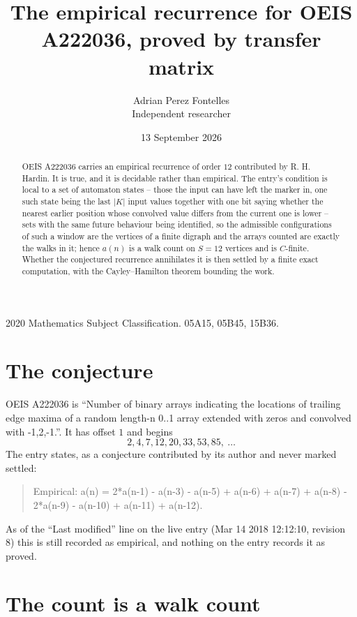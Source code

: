 \documentclass[11pt,a4paper]{article}
\title{The empirical recurrence for OEIS A222036, proved by transfer matrix}
\author{Adrian Perez Fontelles\\ \small Independent researcher}
\date{13 September 2026}
\theoremstyle{plain}
\theoremstyle{definition}
\begin{document}
\maketitle

\begin{abstract}
OEIS A222036 carries an empirical recurrence of order $12$ contributed by R. H. Hardin. It is
true, and it is decidable rather than empirical. The entry's condition is local to a set of automaton states -- those the input can have left the marker in, one such state being the last $|K|$ input values together with one bit saying whether the nearest earlier position whose convolved value differs from the current one is lower -- sets with the same future behaviour being identified, so
the admissible configurations of such a window are the vertices of a finite digraph and the
arrays counted are exactly the walks in it; hence $a(n)$ is a walk count on $S=12$ vertices
and is $C$-finite. Whether the conjectured recurrence annihilates it is then settled by a
finite exact computation, with the Cayley--Hamilton theorem bounding the work.
\end{abstract}

\noindent\small 2020 Mathematics Subject Classification. 05A15, 05B45, 15B36.\normalsize

\section{The conjecture}

OEIS A222036 is ``Number of binary arrays indicating the locations of trailing edge maxima of a random length-n 0..1 array extended with zeros and convolved with -1,2,-1.''. It has offset $1$ and begins
\[
2, 4, 7, 12, 20, 33, 53, 85,\ \dots
\]
The entry states, as a conjecture contributed by its author and never marked settled:
\begin{quote}
Empirical: a(n) = 2*a(n-1) - a(n-3) - a(n-5) + a(n-6) + a(n-7) + a(n-8) - 2*a(n-9) - a(n-10) + a(n-11) + a(n-12).
\end{quote}
As of the ``Last modified'' line on the live entry (Mar 14 2018 12:12:10, revision 8) this is still
recorded as empirical, and nothing on the entry records it as proved.

\section{The count is a walk count}
\end{document}

